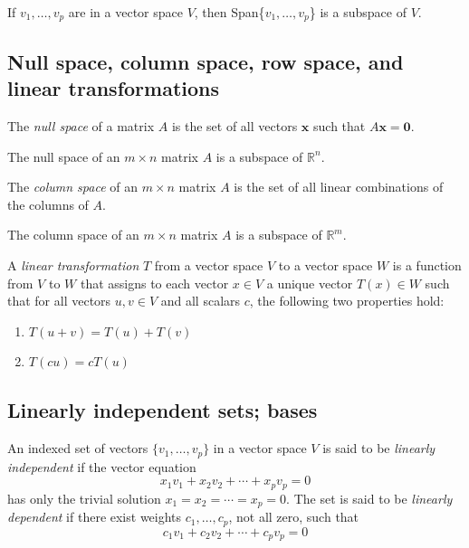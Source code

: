 \documentclass{article}
\begin{document}
\begin{thm}
    If $v_1,\ldots,v_p$ are in a vector space $V$, then Span\{$v_1,\ldots,v_p$\} is a subspace of $V$.
\end{thm}

\subsection{Null space, column space, row space, and linear transformations}

\begin{defn}
    The \emph{null space} of a matrix $A$ is the set of all vectors $\mathbf{x}$ such that $A\mathbf{x} = \mathbf{0}$.
\end{defn}

\begin{thm}
    The null space of an $m\times n$ matrix $A$ is a subspace of $\mathbb{R}^n$.
\end{thm}

\begin{defn}
    The \emph{column space} of an $m\times n$ matrix $A$ is the set of all linear combinations of the columns of $A$.
\end{defn}

\begin{thm}
    The column space of an $m\times n$ matrix $A$ is a subspace of $\mathbb{R}^m$.
\end{thm}

\begin{defn}
    A \emph{linear transformation} \(T\) from a vector space \(V\) to a vector space \(W\) is a function from \(V\) to \(W\) that assigns to each vector \(x \in V\) a unique vector \(T(x) \in W\) such that for all vectors \(u, v \in V\) and all scalars \(c\), the following two properties hold:
\begin{enumerate}
    \item \(T(u+v) = T(u) + T(v)\)
    \item \(T(cu) = cT(u)\)
\end{enumerate}
\end{defn}

\subsection{Linearly independent sets; bases}

\begin{defn}
    An indexed set of vectors \(\{v_1,\ldots,v_p\}\) in a vector space \(V\) is said to be \emph{linearly independent} if the vector equation \[x_1v_1+x_2v_2+\cdots+x_pv_p=0\] has only the trivial solution \(x_1=x_2=\cdots=x_p=0\). The set is said to be \emph{linearly dependent} if there exist weights \(c_1,\ldots,c_p\), not all zero, such that \[c_1v_1+c_2v_2+\cdots+c_pv_p=0\]
\end{defn}
\end{document}
